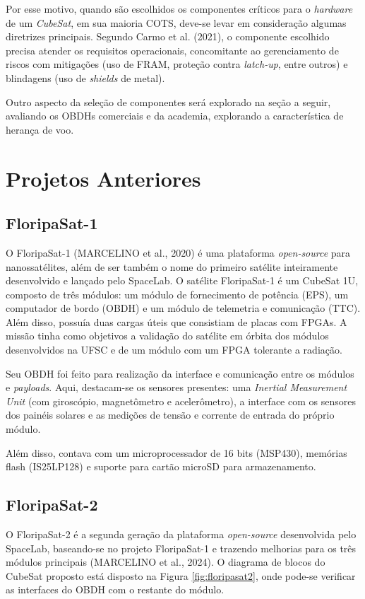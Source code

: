 Por esse motivo, quando são escolhidos os componentes críticos para o \textit{hardware} de um \textit{CubeSat}, em sua maioria COTS, deve-se levar em consideração algumas diretrizes principais. Segundo Carmo et al. (2021), o componente escolhido precisa atender os requisitos operacionais, concomitante ao gerenciamento de riscos com mitigações (uso de FRAM, proteção contra \textit{latch-up}, entre outros) e blindagens (uso de \textit{shields} de metal). 

Outro aspecto da seleção de componentes será explorado na seção a seguir, avaliando os OBDHs comerciais e da academia, explorando a característica de herança de voo.

\section{Projetos Anteriores}

\subsection{FloripaSat-1}
O FloripaSat-1 (MARCELINO et al., 2020) é uma plataforma \textit{open-source} para nanossatélites, além de ser também o nome do primeiro satélite inteiramente desenvolvido e lançado pelo SpaceLab. O satélite FloripaSat-1 é um CubeSat 1U,  composto de três módulos: um módulo de fornecimento de potência (EPS), um computador de bordo (OBDH) e um módulo de telemetria e comunicação (TTC). Além disso, possuía duas cargas úteis que consistiam de placas com FPGAs. A missão tinha como objetivos a validação do satélite em órbita dos módulos desenvolvidos na UFSC e de um módulo com um FPGA tolerante a radiação.

Seu OBDH foi feito para realização da interface e comunicação entre os módulos e \textit{payloads}. Aqui, destacam-se os sensores presentes: uma \textit{Inertial Measurement Unit} (com giroscópio, magnetômetro e acelerômetro), a interface com os sensores dos painéis solares e as medições de tensão e corrente de entrada do próprio módulo.

Além disso, contava com um microprocessador de 16 bits (MSP430), memórias flash (IS25LP128) e suporte para cartão microSD para armazenamento.

\subsection{FloripaSat-2}
O FloripaSat-2 é a segunda geração da plataforma \textit{open-source} desenvolvida pelo SpaceLab, baseando-se no projeto FloripaSat-1 e trazendo melhorias para os três módulos principais (MARCELINO et al., 2024). O diagrama de blocos do CubeSat proposto está disposto na Figura \ref{fig:floripasat2}, onde pode-se verificar as interfaces do OBDH com o restante do módulo.

